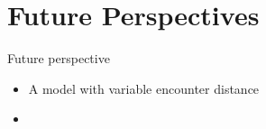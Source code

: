 \documentclass[8pt]{beamer}
\begin{document}
\section{Future Perspectives}
\begin{frame}{Future perspective}
\begin{itemize}
\item A model with variable encounter distance
\item 
\end{itemize}
\end{frame}
\end{document}
